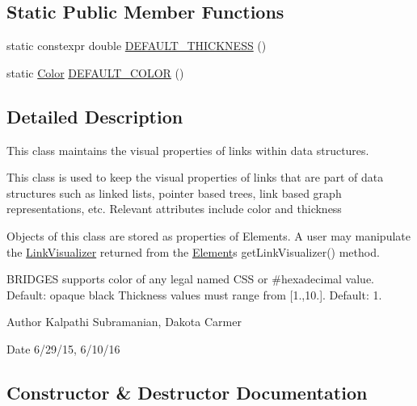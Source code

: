 \subsection*{Static Public Member Functions}
\begin{DoxyCompactItemize}
\item 
static constexpr double \hyperlink{classbridges_1_1_link_visualizer_a6d05e052d64964d876f557901635079d}{D\+E\+F\+A\+U\+L\+T\+\_\+\+T\+H\+I\+C\+K\+N\+E\+S\+S} ()
\item 
static \hyperlink{classbridges_1_1_color}{Color} \hyperlink{classbridges_1_1_link_visualizer_a5e121c52fc270337c58413d0fd72cf58}{D\+E\+F\+A\+U\+L\+T\+\_\+\+C\+O\+L\+O\+R} ()
\end{DoxyCompactItemize}


\subsection{Detailed Description}
This class maintains the visual properties of links within data structures. 

This class is used to keep the visual properties of links that are part of data structures such as linked lists, pointer based trees, link based graph representations, etc. Relevant attributes include color and thickness

Objects of this class are stored as properties of Elements. A user may manipulate the \hyperlink{classbridges_1_1_link_visualizer}{Link\+Visualizer} returned from the \hyperlink{classbridges_1_1_element}{Element}\textquotesingle{}s get\+Link\+Visualizer() method.

B\+R\+I\+D\+G\+E\+S supports color of any legal named C\+S\+S or \#hexadecimal value. Default\+: opaque black Thickness values must range from \mbox{[}1.,10.\mbox{]}. Default\+: 1.

\begin{DoxyAuthor}{Author}
Kalpathi Subramanian, Dakota Carmer 
\end{DoxyAuthor}
\begin{DoxyDate}{Date}
6/29/15, 6/10/16 
\end{DoxyDate}


\subsection{Constructor \& Destructor Documentation}
\hypertarget{classbridges_1_1_link_visualizer_a69a84adf2b85773120d3f6afd938488e}{}
